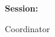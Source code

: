 \begin{titlepage}
    \begin{center}
        \large
        \MakeUppercase{\university}
        
        \LARGE
        \textbf{\MakeUppercase{\faculty}}
        
        \vspace{8cm}
        \huge
        \textbf{\thesistitle}
        
        \vspace{2cm}
        \LARGE
        \textbf{\authornamelf}
        
        \vfill
        \Large
        \textbf{Session:} \session
        
        \vspace{4cm}
        \Large
        Coordinator
        
        \vspace{0.5cm}
        \LARGE
        \textbf{\coordinator}
    \end{center}
\end{titlepage}